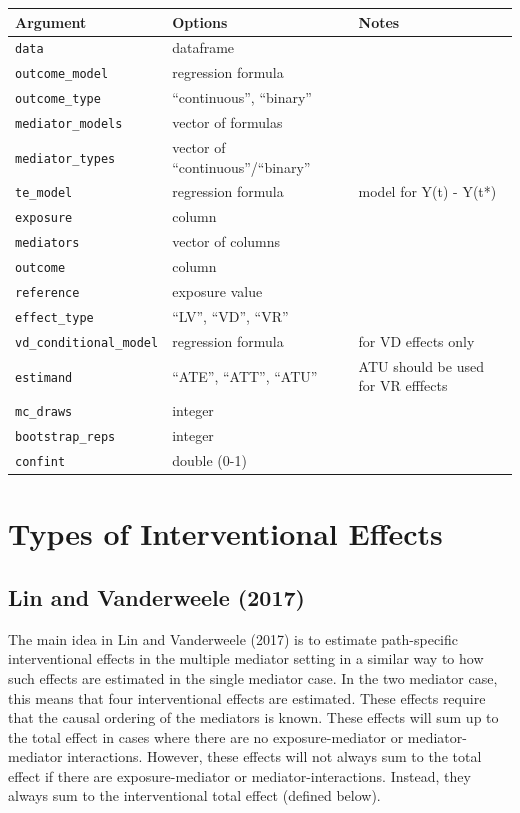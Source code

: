 \documentclass[12pt]{article} %
\numberwithin{equation}{section} %
\begin{document}
\begin{center}
\begin{tabular}{ |l|l|p{4cm}| } 
 \hline
 \textbf{Argument} & \textbf{Options} & \textbf{Notes} \\ 
 \hline
 \texttt{data} & dataframe & \\ 
 \hline
 \texttt{outcome\_model} & regression formula & \\ 
 \hline
 \texttt{outcome\_type} & ``continuous'', ``binary'' & \\ 
 \hline
 \texttt{mediator\_models} & vector of formulas & \\ 
 \hline
 \texttt{mediator\_types} & vector of ``continuous''/``binary'' & \\ 
 \hline
 \texttt{te\_model} & regression formula & model for Y(t) - Y(t*)\\ 
 \hline
 \texttt{exposure} & column & \\ 
 \hline
 \texttt{mediators} & vector of columns & \\
 \hline
 \texttt{outcome} & column & \\ 
 \hline
 \texttt{reference} & exposure value & \\
 \hline
 \texttt{effect\_type} & ``LV'', ``VD'', ``VR'' & \\ 
 \hline
 \texttt{vd\_conditional\_model} & regression formula & for VD effects only\\ 
 \hline
 \texttt{estimand} & ``ATE'', ``ATT'', ``ATU'' & ATU should be used for VR efffects \\ 
 \hline
 \texttt{mc\_draws} & integer & \\ 
 \hline
 \texttt{bootstrap\_reps} & integer & \\ 
  \hline
 \texttt{confint} & double (0-1) & \\ 
 \hline

\end{tabular}
\end{center}


\section{Types of Interventional Effects}

\subsection{Lin and Vanderweele (2017)}

The main idea in Lin and Vanderweele (2017) is to estimate path-specific interventional effects 
in the multiple mediator setting in a similar way to how such effects are estimated in the single
mediator case. In the two mediator case, this means that four interventional effects are estimated.
These effects require that the causal ordering of the mediators is known. These effects will sum up 
to the total effect in cases where there are no exposure-mediator or mediator-mediator interactions.
However, these effects will not always sum to the total effect if there are exposure-mediator or 
mediator-interactions. Instead, they always sum to the interventional total effect (defined below). 
\end{document}
